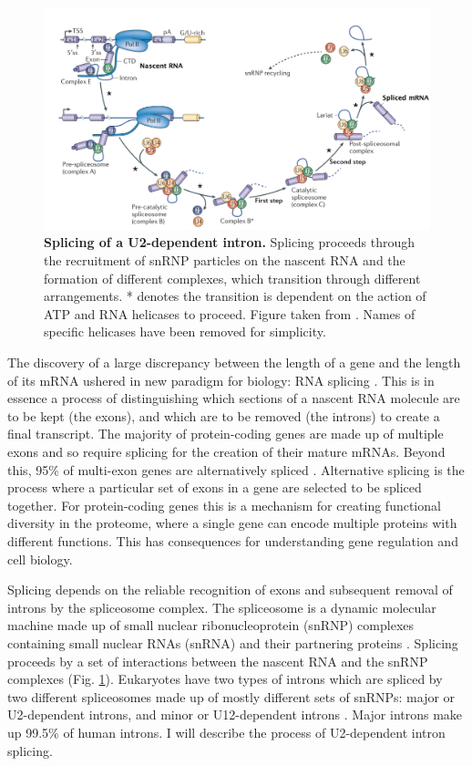 \begin{figure}[h!]
	\centering
	\includegraphics[width=\textwidth]{Figures/01_introduction/splicing.png}
	\caption[Splicing of a U2-dependent intron]{
		\textbf{Splicing of a U2-dependent intron.}
		Splicing proceeds through the recruitment of snRNP particles on the nascent RNA and the formation of different complexes, which transition through different arrangements. 
		* denotes the transition is dependent on the action of ATP and RNA helicases to proceed.
		Figure taken from \citep{Matera2014}. Names of specific helicases have been removed for simplicity.
	 }
	\label{fig:intro_splicing}
\end{figure}

The discovery of a large discrepancy between the length of a gene and the length of its mRNA ushered in new paradigm for biology: RNA splicing \citep{Berget1977,Chow1977}.
This is in essence a process of distinguishing which sections of a nascent RNA molecule are to be kept (the exons), and which are to be removed (the introns) to create a final transcript.
The majority of protein-coding genes are made up of multiple exons and so require splicing for the creation of their mature mRNAs. 
Beyond this, 95\% of multi-exon genes are alternatively spliced \citep{Pan2008,Wang2008}. 
Alternative splicing is the process where a particular set of exons in a gene are selected to be spliced together.
For protein-coding genes this is a mechanism for creating functional diversity in the proteome, where a single gene can encode multiple proteins with different functions.
This has consequences for understanding gene regulation and cell biology.

Splicing depends on the reliable recognition of exons and subsequent removal of introns by the spliceosome complex. 
The spliceosome is a dynamic molecular machine made up of small nuclear ribonucleoprotein (snRNP) complexes containing small nuclear RNAs (snRNA) and their partnering proteins \citep{Matera2014}. 
Splicing proceeds by a set of interactions between the nascent RNA and the snRNP complexes (Fig. \ref{fig:intro_splicing}).
Eukaryotes have two types of introns which are spliced by two different spliceosomes made up of mostly different sets of snRNPs: major or U2-dependent introns, and minor or U12-dependent introns \citep{Tarn1996}. 
Major introns make up 99.5\% of human introns. I will describe the process of U2-dependent intron splicing.

